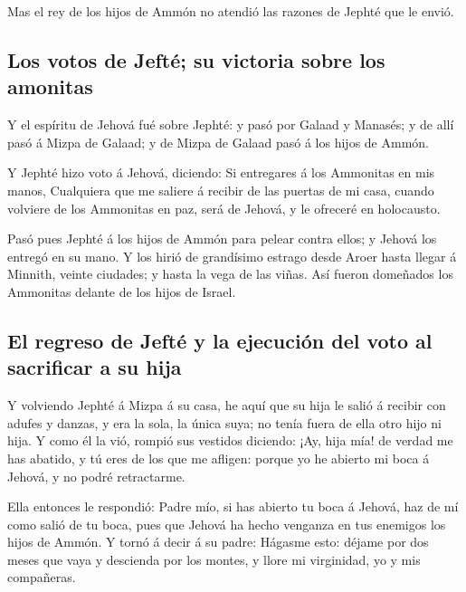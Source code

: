  Mas el rey de los hijos de Ammón no atendió las razones
de Jephté que le envió.

\hypertarget{los-votos-de-jeftuxe9-su-victoria-sobre-los-amonitas}{%
\subsection{Los votos de Jefté; su victoria sobre los
amonitas}\label{los-votos-de-jeftuxe9-su-victoria-sobre-los-amonitas}}

 Y el espíritu de Jehová fué sobre Jephté: y pasó por
Galaad y Manasés; y de allí pasó á Mizpa de Galaad; y de Mizpa de Galaad
pasó á los hijos de Ammón.

 Y Jephté hizo voto á Jehová, diciendo: Si entregares á
los Ammonitas en mis manos,  Cualquiera que me saliere á
recibir de las puertas de mi casa, cuando volviere de los Ammonitas en
paz, será de Jehová, y le ofreceré en holocausto.

 Pasó pues Jephté á los hijos de Ammón para pelear contra
ellos; y Jehová los entregó en su mano.  Y los hirió de
grandísimo estrago desde Aroer hasta llegar á Minnith, veinte ciudades;
y hasta la vega de las viñas. Así fueron domeñados los Ammonitas delante
de los hijos de Israel.

\hypertarget{el-regreso-de-jeftuxe9-y-la-ejecuciuxf3n-del-voto-al-sacrificar-a-su-hija}{%
\subsection{El regreso de Jefté y la ejecución del voto al sacrificar a
su
hija}\label{el-regreso-de-jeftuxe9-y-la-ejecuciuxf3n-del-voto-al-sacrificar-a-su-hija}}

 Y volviendo Jephté á Mizpa á su casa, he aquí que su
hija le salió á recibir con adufes y danzas, y era la sola, la única
suya; no tenía fuera de ella otro hijo ni hija.  Y como
él la vió, rompió sus vestidos diciendo: ¡Ay, hija mía! de verdad me has
abatido, y tú eres de los que me afligen: porque yo he abierto mi boca á
Jehová, y no podré retractarme.

 Ella entonces le respondió: Padre mío, si has abierto tu
boca á Jehová, haz de mí como salió de tu boca, pues que Jehová ha hecho
venganza en tus enemigos los hijos de Ammón.  Y tornó á
decir á su padre: Hágasme esto: déjame por dos meses que vaya y
descienda por los montes, y llore mi virginidad, yo y mis compañeras.

